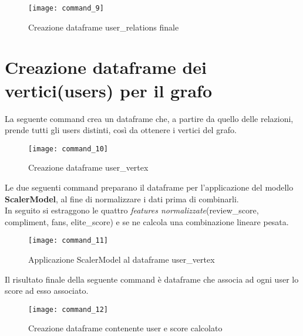 \begin{figure}[!htbp]
	\texttt{[image: command\_9]}
	\caption{Creazione dataframe user\_relations finale}
	\label{command_9}
\end{figure}

\clearpage

\section{Creazione dataframe dei vertici(users) per il grafo}
La seguente command crea un dataframe che, a partire da quello delle relazioni,
prende tutti gli users distinti, così da ottenere i vertici
del grafo.
\begin{figure}[!htbp]
	\texttt{[image: command\_10]}
	\caption{Creazione dataframe user\_vertex}
	\label{command_10}
\end{figure}

Le due seguenti command preparano il dataframe per l'applicazione del modello
\textbf{ScalerModel}, al fine di normalizzare i dati prima di combinarli.\\
In seguito si estraggono le quattro \textit{features normalizzate}(review\_score,
compliment, fans, elite\_score) e se ne calcola una combinazione lineare pesata.
\begin{figure}[!htbp]
	\texttt{[image: command\_11]}
	\caption{Applicazione ScalerModel al dataframe user\_vertex}
	\label{command_11}
\end{figure}

\clearpage

Il risultato finale della seguente command è dataframe che associa ad ogni user
lo score ad esso associato.
\begin{figure}[!htbp]
 	\texttt{[image: command\_12]}
 	\caption{Creazione dataframe contenente user e score calcolato}
 	\label{command_12}
\end{figure}

